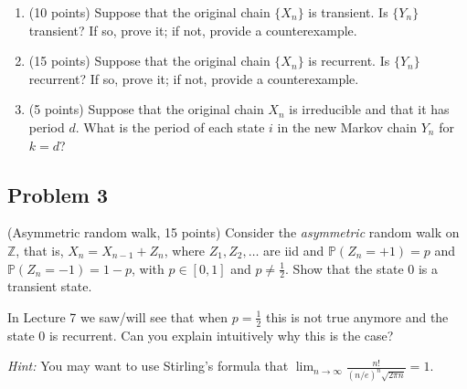 \documentclass{article}
\begin{document}
\begin{enumerate}
        \item (10 points) Suppose that the original chain $\{X_n\}$ is transient. Is $\{Y_n\}$ transient? If so, prove it; if not, provide a counterexample.

            \textcolor{blue}{}

        
        \item (15 points) Suppose that the original chain $\{X_n\}$ is recurrent. Is $\{Y_n\}$ recurrent? If so, prove it; if not, provide a counterexample.

            \textcolor{blue}{}

        
        \item (5 points) Suppose that the original chain $X_n$ is irreducible and that it has period $d$. What is the period of each state $i$ in the new Markov chain $Y_n$ for $k = d$?

           \textcolor{blue}{}

    \end{enumerate}

\subsection*{Problem 3} (Asymmetric random walk, 15 points) Consider the \textit{asymmetric} random walk on $\mathbb{Z}$, that is, $X_n = X_{n-1} + Z_n$, where $Z_1, Z_2, \dots$ are iid and $\mathbb{P}(Z_n = +1) = p$ and $\mathbb{P}(Z_n = -1) = 1 - p$, with $p \in [0,1]$ and $p \neq \frac{1}{2}$. Show that the state 0 is a transient state.

    In Lecture 7 we saw/will see that when $p = \frac{1}{2}$ this is not true anymore and the state 0 is recurrent. Can you explain intuitively why this is the case?

    \textit{Hint:} You may want to use Stirling’s formula that $\lim_{n \to \infty} \frac{n!}{(n/e)^n \sqrt{2\pi n}} = 1$.
\end{document}
